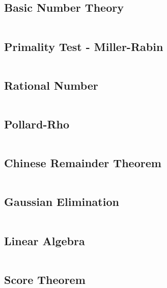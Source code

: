 \subsection{Basic Number Theory} %
\inputminted{cpp}{src/Math/basic.cpp}

\subsection{Primality Test - Miller-Rabin} %
\inputminted{cpp}{src/Math/primality.cpp}

\subsection{Rational Number} %
\inputminted{cpp}{src/Math/rational.cpp}

\subsection{Pollard-Rho} %
\inputminted{cpp}{src/Math/pollard-rho.cpp}

\subsection{Chinese Remainder Theorem} %
\inputminted{cpp}{src/Math/crt.cpp}



\subsection{Gaussian Elimination} %
\inputminted{cpp}{src/Math/gaussian-int.cpp}

\subsection{Linear Algebra} %
\inputminted{cpp}{src/Math/matrix.cpp}


\subsection{Score Theorem}


